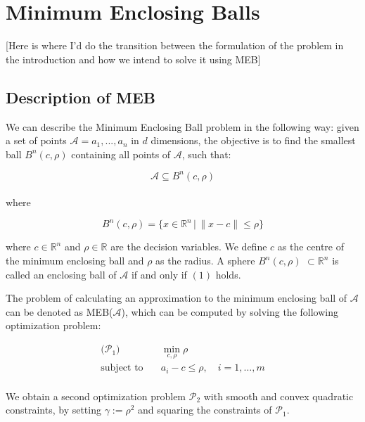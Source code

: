 \documentclass[12pt,a4paper]{article}
\begin{document}
\section{Minimum Enclosing Balls}

[Here is where I'd do the transition between the formulation of the problem in the introduction and how we intend to solve it using MEB]

\subsection{Description of MEB}

We can describe the Minimum Enclosing Ball problem in the following way: given a set of points \(\mathcal{A} = a_1, ..., a_n\) in \(d\) dimensions, the objective is to find the smallest ball \(B^n(c, \rho) \) containing all points of $\mathcal{A}$, such that:

\begin{equation}
\mathcal{A} \subseteq B^n(c, \rho)
\end{equation}\\
where

\begin{equation}
B^n(c, \rho) = \{x \in \mathbb{R}^n \, | \, \|x - c\| \leq \rho\}
\end{equation}

where \( c \in \mathbb{R}^n \) and \( \rho \in \mathbb{R} \) are the decision variables. We define \( c \) as the centre of the minimum enclosing ball and \( \rho \) as the radius. A sphere \(B^n(c, \rho)\) \(\subset \mathbb{R}^n\) is called an enclosing ball of \(\mathcal{A} \) if and only if \((1)\) holds.

The problem of calculating an approximation to the minimum enclosing ball  of $\mathcal{A}$ can be denoted as MEB($\mathcal{A}$), which can be computed by solving the following optimization problem:

\begin{align*}
\text{($\mathcal{P}_1$)} \quad & \min_{c, \rho} \rho \\
\text{subject to} \quad & a_i - c \leq \rho, \quad i = 1, \ldots, m\\
\end{align*}

We obtain a second optimization problem $\mathcal{P}_2$ with smooth and convex quadratic constraints, by setting \(\gamma := \rho^2 \) and squaring the constraints of $\mathcal{P}_1$.
\end{document}
